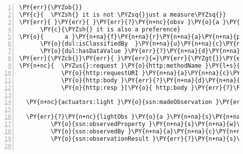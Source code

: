 \expandafter\def\csname PY@tok@err\endcsname{}
\begin{Verbatim}[commandchars=\\\{\},numbers=left,firstnumber=1,stepnumber=1]
\PY{err}{\PYZob{}}
\PY{c}{  \PYZsh{} it is not \PYZsq{}just a measure\PYZsq{}}
\PY{err}{ }\PY{err}{ }\PY{err}{?}\PY{n+nc}{obsv }\PY{o}{a }\PY{n+na}{s}\PY{n+na}{s}\PY{n+na}{n}\PY{n+na}{:}\PY{n+na}{O}\PY{n+na}{b}\PY{n+na}{s}\PY{n+na}{e}\PY{n+na}{r}\PY{n+na}{v}\PY{n+na}{a}\PY{n+na}{t}\PY{n+na}{i}\PY{n+na}{o}\PY{n+na}{n}\PY{n+na}{V}\PY{n+na}{a}\PY{n+na}{l}\PY{n+na}{u}\PY{n+na}{e };
      \PY{c}{\PYZsh{} it is also a preference}
\PY{o}{      a }\PY{n+na}{f}\PY{n+na}{r}\PY{n+na}{a}\PY{n+na}{p}\PY{n+na}{:}\PY{n+na}{P}\PY{n+na}{r}\PY{n+na}{e}\PY{n+na}{f}\PY{n+na}{e}\PY{n+na}{r}\PY{n+na}{e}\PY{n+na}{n}\PY{n+na}{c}\PY{n+na}{e };
      \PY{o}{dul:isClassifiedBy  }\PY{n+na}{u}\PY{n+na}{c}\PY{n+na}{u}\PY{n+na}{m}\PY{n+na}{:}\PY{n+na}{l}\PY{n+na}{u}\PY{n+na}{x };
      \PY{o}{dul:hasDataValue }\PY{err}{?}\PY{n+na}{d}\PY{n+na}{e}\PY{n+na}{s}\PY{n+na}{i}\PY{n+na}{r}\PY{n+na}{e}\PY{n+na}{d}\PY{n+na}{\PYZus{}}\PY{n+na}{v}\PY{n+na}{a}\PY{n+na}{l}\PY{n+na}{u}\PY{n+na}{e }.
\PY{err}{\PYZcb{}}\PY{err}{ }\PY{err}{=}\PY{err}{\PYZgt{}}\PY{err}{ }\PY{err}{\PYZob{}}
\PY{n+nc}{  \PYZus{}:request }\PY{o}{http:methodName }\PY{l+s}{\PYZdq{}POST\PYZdq{}};
            \PY{o}{http:requestURI }\PY{n+na}{a}\PY{n+na}{c}\PY{n+na}{t}\PY{n+na}{u}\PY{n+na}{a}\PY{n+na}{t}\PY{n+na}{o}\PY{n+na}{r}\PY{n+na}{s}\PY{n+na}{:}\PY{n+na}{l}\PY{n+na}{i}\PY{n+na}{g}\PY{n+na}{h}\PY{n+na}{t };
            \PY{o}{http:body }\PY{err}{?}\PY{n+na}{d}\PY{n+na}{e}\PY{n+na}{s}\PY{n+na}{i}\PY{n+na}{r}\PY{n+na}{e}\PY{n+na}{d}\PY{n+na}{\PYZus{}}\PY{n+na}{v}\PY{n+na}{a}\PY{n+na}{l}\PY{n+na}{u}\PY{n+na}{e };
            \PY{o}{http:resp }[\PY{o}{ http:body }\PY{err}{?}\PY{n+na}{l}\PY{n+na}{i}\PY{n+na}{g}\PY{n+na}{h}\PY{n+na}{t}\PY{n+na}{O}\PY{n+na}{b}\PY{n+na}{s }].
  
  \PY{n+nc}{actuators:light }\PY{o}{ssn:madeObservation }\PY{err}{?}\PY{n+na}{l}\PY{n+na}{i}\PY{n+na}{g}\PY{n+na}{h}\PY{n+na}{t}\PY{n+na}{O}\PY{n+na}{b}\PY{n+na}{s }.
  
  \PY{err}{?}\PY{n+nc}{lightObs }\PY{o}{a }\PY{n+na}{s}\PY{n+na}{s}\PY{n+na}{n}\PY{n+na}{:}\PY{n+na}{O}\PY{n+na}{b}\PY{n+na}{s}\PY{n+na}{e}\PY{n+na}{r}\PY{n+na}{v}\PY{n+na}{a}\PY{n+na}{t}\PY{n+na}{i}\PY{n+na}{o}\PY{n+na}{n };
         \PY{o}{ssn:observedProperty }\PY{n+na}{s}\PY{n+na}{w}\PY{n+na}{e}\PY{n+na}{e}\PY{n+na}{t}\PY{n+na}{:}\PY{n+na}{L}\PY{n+na}{i}\PY{n+na}{g}\PY{n+na}{h}\PY{n+na}{t };
         \PY{o}{ssn:observedBy }\PY{n+na}{a}\PY{n+na}{c}\PY{n+na}{t}\PY{n+na}{u}\PY{n+na}{a}\PY{n+na}{t}\PY{n+na}{o}\PY{n+na}{r}\PY{n+na}{s}\PY{n+na}{:}\PY{n+na}{l}\PY{n+na}{i}\PY{n+na}{g}\PY{n+na}{h}\PY{n+na}{t };
         \PY{o}{ssn:observationResult }\PY{err}{?}\PY{n+na}{s}\PY{n+na}{o }.
     

\end{Verbatim}
